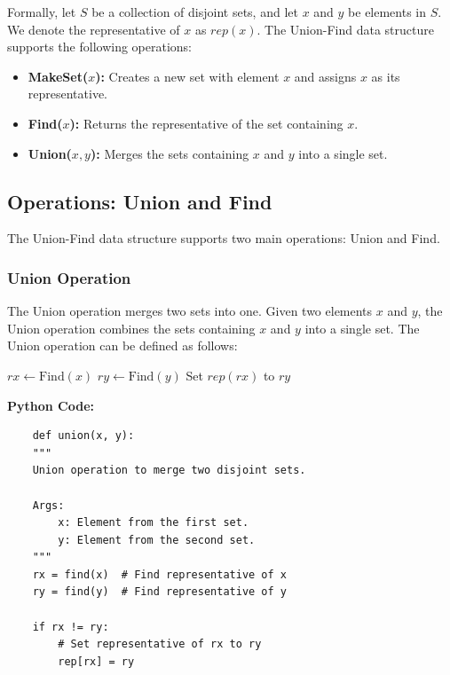 \documentclass[12pt]{book} %
\begin{document}
Formally, let \(S\) be a collection of disjoint sets, and let \(x\) and \(y\) be elements in \(S\). We denote the representative of \(x\) as \(rep(x)\). The Union-Find data structure supports the following operations:

\begin{itemize}
    \item \textbf{MakeSet(\(x\)):} Creates a new set with element \(x\) and assigns \(x\) as its representative.
    \item \textbf{Find(\(x\)):} Returns the representative of the set containing \(x\).
    \item \textbf{Union(\(x, y\)):} Merges the sets containing \(x\) and \(y\) into a single set.
\end{itemize}


\subsection{Operations: Union and Find}

The Union-Find data structure supports two main operations: Union and Find.

\subsubsection{Union Operation}

The Union operation merges two sets into one. Given two elements \(x\) and \(y\), the Union operation combines the sets containing \(x\) and \(y\) into a single set. The Union operation can be defined as follows:
\FloatBarrier
\begin{algorithm}[H]
\caption{Union(\(x, y\))}
\begin{algorithmic}[1]
    \State \(rx \gets \text{Find}(x)\)
    \State \(ry \gets \text{Find}(y)\)
        \State Set \(rep(rx)\) to \(ry\)
    \EndIf
\EndFunction
\end{algorithmic}
\end{algorithm}
\FloatBarrier
\textbf{Python Code:}
\FloatBarrier
\begin{lstlisting}
    def union(x, y):
    """
    Union operation to merge two disjoint sets.
    
    Args:
        x: Element from the first set.
        y: Element from the second set.
    """
    rx = find(x)  # Find representative of x
    ry = find(y)  # Find representative of y
    
    if rx != ry:
        # Set representative of rx to ry
        rep[rx] = ry
\end{lstlisting}
\end{document}

